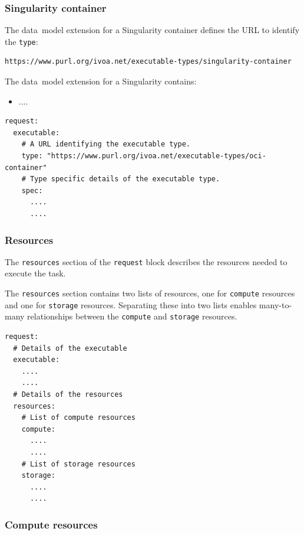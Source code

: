 \documentclass[11pt,a4paper]{ivoa}
\newcommand{\datamodel} {data~model}
\newcommand{\singularity} {Singularity}
\newcommand{\codeword}[1] {\texttt{#1}}
\begin{document}
\subsubsection{Singularity container}
\label{datamodel-singularity-container}

The \datamodel{} extension for a \singularity{} container defines the URL
to identify the \codeword{type}:
\begin{lstlisting}[]
https://www.purl.org/ivoa.net/executable-types/singularity-container
\end{lstlisting}
\hfill \break
The \datamodel{} extension for a \singularity{} contains:
\begin{itemize}
    \item ....
\end{itemize}

\begin{lstlisting}[]
request:
  executable:
    # A URL identifying the executable type.
    type: "https://www.purl.org/ivoa.net/executable-types/oci-container"
    # Type specific details of the executable type.
    spec:
      ....
      ....
\end{lstlisting}

\subsubsection{Resources}
\label{datamodel-resources}

The \codeword{resources} section of the \codeword{request} block describes the resources needed
to execute the task.

The \codeword{resources} section contains two lists of resources, one for
\codeword{compute} resources and one for \codeword{storage} resources.
Separating these into two lists enables many-to-many relationships between the \codeword{compute}
and \codeword{storage} resources.

\begin{lstlisting}[]
request:
  # Details of the executable
  executable:
    ....
    ....
  # Details of the resources
  resources:
    # List of compute resources
    compute:
      ....
      ....
    # List of storage resources
    storage:
      ....
      ....
\end{lstlisting}

\subsubsection{Compute resources}
\label{datamodel-compute-resources}
\end{document}
